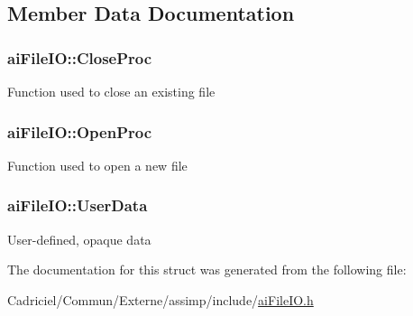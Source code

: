 \subsection{Member Data Documentation}
\hypertarget{structai_file_i_o_a7ec702672712b5a02dc49cb17f980a14}{
\subsubsection[{Close\-Proc}]{ ai\-File\-I\-O\-::\-Close\-Proc}}\label{structai_file_i_o_a7ec702672712b5a02dc49cb17f980a14}
Function used to close an existing file \hypertarget{structai_file_i_o_a819d9c7823039294125068d06949a6df}{
\subsubsection[{Open\-Proc}]{ ai\-File\-I\-O\-::\-Open\-Proc}}\label{structai_file_i_o_a819d9c7823039294125068d06949a6df}
Function used to open a new file \hypertarget{structai_file_i_o_a9c62b7f3d70fbb2f41e33ad0b9933139}{
\subsubsection[{User\-Data}]{ ai\-File\-I\-O\-::\-User\-Data}}\label{structai_file_i_o_a9c62b7f3d70fbb2f41e33ad0b9933139}
User-\/defined, opaque data 

The documentation for this struct was generated from the following file\-:\begin{DoxyCompactItemize}
\item 
Cadriciel/\-Commun/\-Externe/assimp/include/\hyperlink{ai_file_i_o_8h}{ai\-File\-I\-O.\-h}\end{DoxyCompactItemize}
